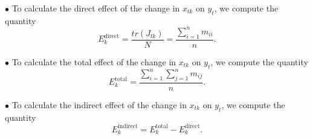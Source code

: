 \documentclass[11pt,a4paper]{amsart}
\theoremstyle{plain}
\theoremstyle{definition}
\begin{document}
\vspace{10pt}

$\bullet$ To calculate the direct effect of the change in $x_{tk}$ on $y_{t}$, we compute the quantity
\[	E_{k}^{\text{direct}} = \frac{tr(J_{tk})}{N} = \frac{\sum_{i=1}^{n} m_{ii}}{n}.	\]


\vspace{5pt}

$\bullet$ To calculate the total effect of the change in $x_{tk}$ on $y_{t}$, we compute the quantity
\[	E_{k}^{\text{total}} = \frac{\sum_{i=1}^{n} \sum_{j=1}^{n} m_{ij}}{n}.	\]

$\bullet$ To calculate the indirect effect of the change in $x_{tk}$ on $y_{t}$, we compute the quantity
\[	E_{k}^{\text{indirect}} =  	E_{k}^{\text{total}} - E_{k}^{\text{direct}}. \]

		
\end{document}
